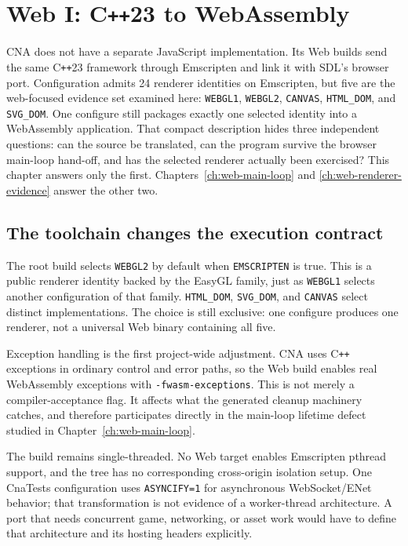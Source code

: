 \chapter{Web I: C\texttt{++}23 to WebAssembly}
\label{ch:web-compiling}
\label{ch:web-emscripten}

CNA does not have a separate JavaScript implementation. Its Web builds send the same
C\texttt{++}23 framework through Emscripten and link it with SDL's browser port. Configuration
admits 24 renderer identities on Emscripten, but five are the web-focused evidence set examined
here: \texttt{WEBGL1}, \texttt{WEBGL2}, \texttt{CANVAS}, \texttt{HTML\_DOM}, and
\texttt{SVG\_DOM}. One configure still packages exactly one selected identity into a WebAssembly
application. That compact description hides three independent questions: can the source be
translated, can the program survive the browser main-loop hand-off, and has the selected renderer
actually been exercised? This chapter answers only the first. Chapters~\ref{ch:web-main-loop} and
\ref{ch:web-renderer-evidence} answer the other two.

\section{The toolchain changes the execution contract}

The root build selects \texttt{WEBGL2} by default when \texttt{EMSCRIPTEN} is true.  This is a
public renderer identity backed by the EasyGL family, just as \texttt{WEBGL1} selects another
configuration of that family.  \texttt{HTML\_DOM}, \texttt{SVG\_DOM}, and \texttt{CANVAS}
select distinct implementations.  The choice is still exclusive: one configure produces one
renderer, not a universal Web binary containing all five.

Exception handling is the first project-wide adjustment.  CNA uses C\texttt{++} exceptions in
ordinary control and error paths, so the Web build enables real WebAssembly exceptions with
\texttt{-fwasm-exceptions}.  This is not merely a compiler-acceptance flag.  It affects what
the generated cleanup machinery catches, and therefore participates directly in the
main-loop lifetime defect studied in Chapter~\ref{ch:web-main-loop}.

The build remains single-threaded.  No Web target enables Emscripten pthread support, and the
tree has no corresponding cross-origin isolation setup.  One CnaTests configuration uses
\texttt{ASYNCIFY=1} for asynchronous WebSocket/ENet behavior; that transformation is not
evidence of a worker-thread architecture.  A port that needs concurrent game, networking, or
asset work would have to define that architecture and its hosting headers explicitly.

